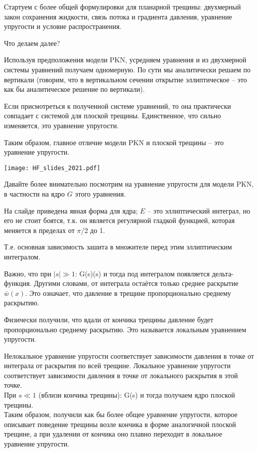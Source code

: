 \documentclass[main.tex]{subfiles}
\begin{document}
Стартуем с более общей формулировки для планарной трещины: двухмерный закон сохранения жидкости, связь потока и градиента давления, уравнение упругости и условие распространения.

Что делаем далее?

Используя предположения модели PKN, усредняем уравнения и из двухмерной системы уравнений получаем одномерную.
По сути мы аналитически решаем по вертикали (говорим, что в вертикальном сечении открытие эллиптическое -- это как бы аналитическое решение по вертикали).

Если присмотреться к полученной системе уравнений, то она практически совпадает с системой для плоской трещины.
Единственное, что сильно изменяется, это уравнение упругости.

Таким образом, главное отличие модели PKN и плоской трещины -- это уравнение упругости.

\texttt{[image: HF\_slides\_2021.pdf]}

Давайте более внимательно посмотрим на уравнение упругости для модели PKN, в частности на ядро $G$ этого уравнения.

На слайде приведена явная форма для ядра; $E$ -- это эллиптический интеграл, но его не стоит боятся, т.к. он является регулярной гладкой функцией, которая меняется в пределах от $\pi$/2 до 1.

Т.е. основная зависимость зашита в множителе перед этим эллиптическим интегралом.

Важно, что при $\left|s\right|\gg 1$:
\beq
G(s)\approx{}(s)
\eeq
и тогда под интегралом появляется дельта-функция.
Другими словами, от интеграла остаётся только среднее раскрытие $\bar{w}(x)$.
Это означает, что давление в трещине пропорционально среднему раскрытию.

Физически получили, что вдали от кончика трещины давление будет пропорционально среднему раскрытию.
Это называется локальным уравнением упругости.

Нелокальное уравнение упругости соответствует зависимости давления в точке от интеграла от раскрытия по всей трещине.
Локальное уравнение упругости соответствует зависимости давления в точке от локального раскрытия в этой точке.
\\

При $s\ll1$ (вблизи кончика трещины):
\beq
G(s)\approx{}
\eeq
и тогда получаем ядро плоской трещины.
\\

Таким образом, получили как бы более общее уравнение упругости, которое описывает поведение трещины возле кончика в форме аналогичной плоской трещине, а при удалении от кончика оно плавно переходит в локальное уравнение упругости.
\end{document}
